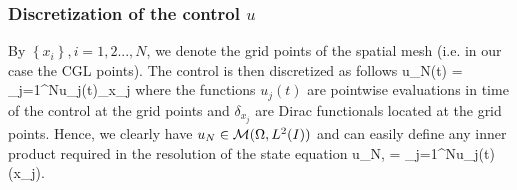 
\subsubsection{Discretization of the control $u$}

By $\left\{x_i \right\}, i = 1, 2 ..., N$, we denote the grid points of the spatial mesh (i.e. in our case the CGL points). The control is then discretized as follows
\be
u_N(t) = \sum_{j=1}^{N}{u_j(t)\delta_{x_j}}
\ee
where the functions $u_j(t)$ are pointwise evaluations in time of the control at the grid points and $\delta_{x_j}$ are Dirac functionals located at the grid points. Hence, we clearly have $u_N \in \mathcal{M}(\Omega, L^{2}(I))$ and can easily define any inner product required in the resolution of the state equation
\be
\langle u_N, \psi \rangle = \sum_{j=1}^{N}{u_j(t)\psi(x_j)}.
\ee

